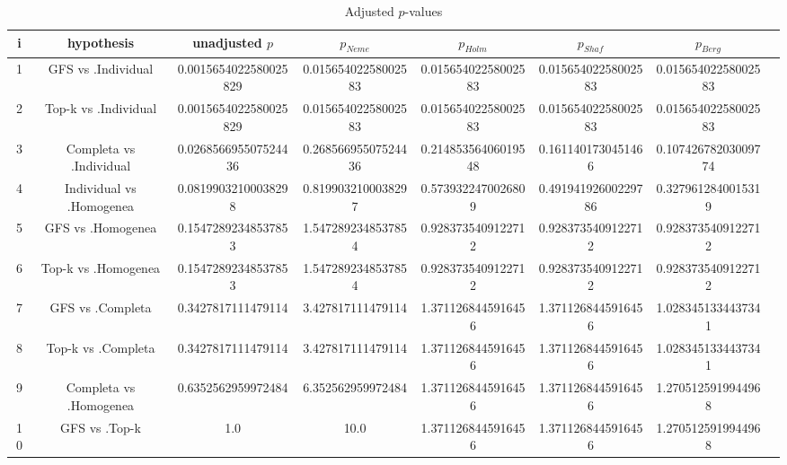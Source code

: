 \documentclass[a4paper,10pt]{article}
\begin{document}
\begin{landscape}
\begin{table}[!htp]
\centering\tiny
\caption{Adjusted $p$-values}
\begin{tabular}{cccccccc}
i&hypothesis&unadjusted $p$&$p_{Neme}$&$p_{Holm}$&$p_{Shaf}$&$p_{Berg}$\\
\hline
1&GFS vs .Individual&0.0015654022580025829&0.01565402258002583&0.01565402258002583&0.01565402258002583&0.01565402258002583\\
2&Top-k vs .Individual&0.0015654022580025829&0.01565402258002583&0.01565402258002583&0.01565402258002583&0.01565402258002583\\
3&Completa vs .Individual&0.026856695507524436&0.26856695507524436&0.21485356406019548&0.1611401730451466&0.10742678203009774\\
4&Individual vs .Homogenea&0.08199032100038298&0.8199032100038297&0.5739322470026809&0.49194192600229786&0.3279612840015319\\
5&GFS vs .Homogenea&0.15472892348537853&1.5472892348537854&0.9283735409122712&0.9283735409122712&0.9283735409122712\\
6&Top-k vs .Homogenea&0.15472892348537853&1.5472892348537854&0.9283735409122712&0.9283735409122712&0.9283735409122712\\
7&GFS vs .Completa&0.3427817111479114&3.427817111479114&1.3711268445916456&1.3711268445916456&1.0283451334437341\\
8&Top-k vs .Completa&0.3427817111479114&3.427817111479114&1.3711268445916456&1.3711268445916456&1.0283451334437341\\
9&Completa vs .Homogenea&0.6352562959972484&6.352562959972484&1.3711268445916456&1.3711268445916456&1.2705125919944968\\
10&GFS vs .Top-k&1.0&10.0&1.3711268445916456&1.3711268445916456&1.2705125919944968\\
\hline
\end{tabular}
\end{table}

\end{landscape}
\end{document}
